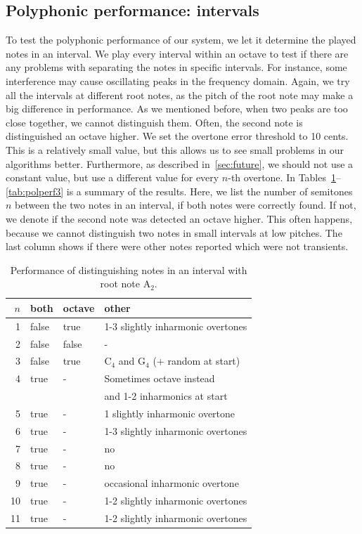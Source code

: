 \documentclass[10pt,twocolumn]{article}
\begin{document}
\subsection{Polyphonic performance: intervals}
To test the polyphonic performance of our system, we let it determine the played notes in an interval. We play every interval within an octave to test if there are any problems with separating the notes in specific intervals. For instance, some interference may cause oscillating peaks in the frequency domain. Again, we try all the intervals at different root notes, as the pitch of the root note may make a big difference in performance. As we mentioned before, when two peaks are too close together, we cannot distinguish them. Often, the second note is distinguished an octave higher. We set the overtone error threshold to 10 cents. This is a relatively small value, but this allows us to see small problems in our algorithms better. Furthermore, as described in~\ref{sec:future}, we should not use a constant value, but use a different value for every $n$-th overtone. In Tables~\ref{tab:polperf1}--\ref{tab:polperf3} is a summary of the results. Here, we list the number of semitones $n$ between the two notes in an interval, if both notes were correctly found. If not, we denote if the second note was detected an octave higher. This often happens, because we cannot distinguish two notes in small intervals at low pitches. The last column shows if there were other notes reported which were not transients.
\begin{table}[H]%
    \centering
    \begin{tabular}{r|lll}
        $n$ & both & octave & other \\
        \hline
        1  & false & true & 1-3 slightly inharmonic overtones \\
        2  & false & false & - \\
        3  & false & true & $\text{C}_4$ and $\text{G}_4$ (+ random at start) \\
        4  & true & - & Sometimes octave instead\\ &&& and 1-2 inharmonics at start \\
        5  & true & - & 1 slightly inharmonic overtone \\
        6  & true & - & 1-3 slightly inharmonic overtones \\
        7  & true & - & no \\
        8  & true & - & no \\
        9  & true & - & occasional inharmonic overtone \\
        10 & true & - & 1-2 slightly inharmonic overtones \\
        11 & true & - & 1-2 slightly inharmonic overtones
    \end{tabular}
    \caption{Performance of distinguishing notes in an interval with root note $\text{A}_2$.}
    \label{tab:polperf1}
\end{table}
\end{document}
